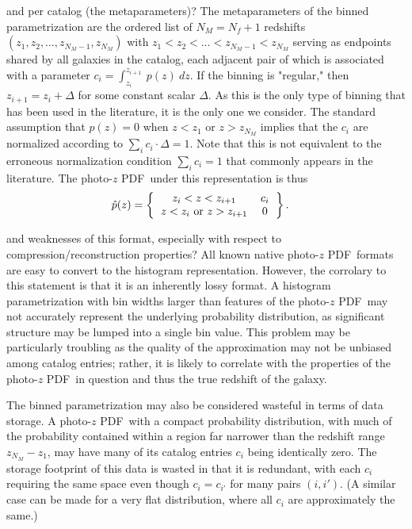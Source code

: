 \documentclass[\docopts]{\docclass}
\newcommand{\pz}{photo-$z$ PDF}
\begin{document}
and per catalog (the metaparameters)?
The metaparameters of the binned parametrization are the ordered list of 
$N_{M}=N_{f}+1$ redshifts $(z_{1}, z_{2}, \dots, z_{N_{M}-1}, z_{N_{M}})$ with 
$z_{1} < z_{2} < \dots < z_{N_{M}-1} < z_{N_{M}}$ serving as endpoints shared 
by all galaxies in the catalog, each adjacent pair of which is associated with 
a parameter $c_{i}=\int_{z_{i}}^{z_{i+1}}\ p(z)\ dz$.  If the binning is 
"regular," then $z_{i+1}=z_{i}+\Delta$ for some constant scalar $\Delta$.  As 
this is the only type of binning that has been used in the literature, it is 
the only one we consider.  The standard assumption that $p(z)=0$ when $z<z_{1}$ 
or $z>z_{N_{M}}$ implies that the $c_{i}$ are normalized according to $\sum_{i} 
c_{i}\cdot\Delta = 1$.  Note that this is not equivalent to the erroneous 
normalization condition $\sum_{i} c_{i} = 1$ that commonly appears in the 
literature.  The \pz\ under this representation is thus
\begin{align}
  \label{eq:bin_interpolated}
  \hat{p}(z) &= \left\{\begin{tabular}{cc}$z_{i}<z<z_{i+1}$&$c_{i}$\\
$z < z_{i}$\ or\ $z > z_{i+1}$&$0$\end{tabular}\right\}.
\end{align}

and weaknesses of this format, especially with respect to 
compression/reconstruction properties?
All known native \pz\ formats are easy to convert to the histogram 
representation.  However, the corrolary to this statement is that it is an 
inherently lossy format.  A histogram parametrization with bin widths larger 
than features of the \pz\ may not accurately represent the underlying 
probability distribution, as significant structure may be lumped into a single 
bin value.  This problem may be particularly troubling as the quality of the 
approximation may not be unbiased among catalog entries; rather, it is likely 
to correlate with the properties of the \pz\ in question and thus the true 
redshift of the galaxy.

The binned parametrization may also be considered wasteful in terms of data 
storage.  A \pz\ with a compact probability distribution, with much of the 
probability contained within a region far narrower than the redshift range 
$z_{N_{M}} - z_{1}$, may have many of its catalog entries $c_{i}$ being 
identically zero.  The storage footprint of this data is wasted in that it is 
redundant, with each $c_{i}$ requiring the same space even though 
$c_{i}=c_{i'}$ for many pairs $(i, i')$.  (A similar case can be made for a 
very flat distribution, where all $c_{i}$ are approximately the same.)
\end{document}
